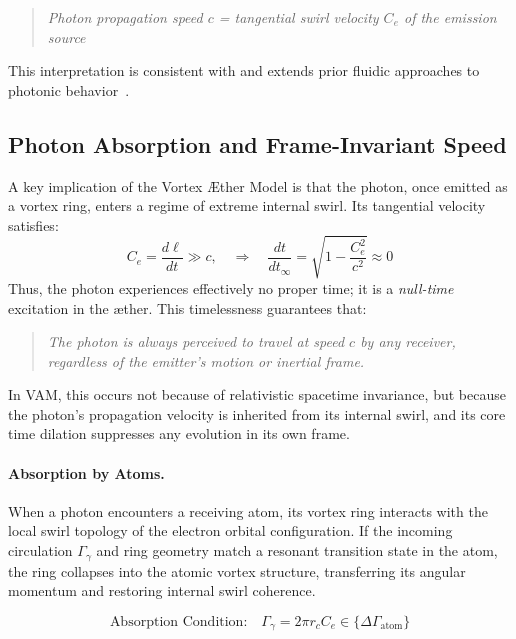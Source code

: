         \begin{quote}
            \emph{Photon propagation speed $c$ =  tangential swirl velocity  $C_e$  of the emission source}
        \end{quote}

        This interpretation is consistent with and extends prior fluidic approaches to photonic behavior~\cite{iskandarani2025b, barut1990, berry2000}.

\subsection{Photon Absorption and Frame-Invariant Speed}

        A key implication of the Vortex \AE ther Model is that the photon, once emitted as a vortex ring, enters a regime of extreme internal swirl. Its tangential velocity satisfies:
        \begin{equation}
            C_e = \frac{d\ell}{dt} \gg c, \quad \Rightarrow \quad \frac{dt}{dt_\infty} = \sqrt{1 - \frac{C_e^2}{c^2}} \approx 0
        \end{equation}
        Thus, the photon experiences effectively no proper time; it is a \emph{null-time} excitation in the \ae ther. This timelessness guarantees that:

        \begin{quote}
            \emph{The photon is always perceived to travel at speed $c$ by any receiver, regardless of the emitter’s motion or inertial frame.}
        \end{quote}

        In VAM, this occurs not because of relativistic spacetime invariance, but because the photon's propagation velocity is inherited from its internal swirl, and its core time dilation suppresses any evolution in its own frame.

        \paragraph{Absorption by Atoms.} When a photon encounters a receiving atom, its vortex ring interacts with the local swirl topology of the electron orbital configuration. If the incoming circulation $\Gamma_\gamma$ and ring geometry match a resonant transition state in the atom, the ring collapses into the atomic vortex structure, transferring its angular momentum and restoring internal swirl coherence.

        \begin{equation}
            \text{Absorption Condition:} \quad \Gamma_\gamma = 2\pi r_c C_e \in \{ \Delta \Gamma_{\text{atom}} \}
        \end{equation}

